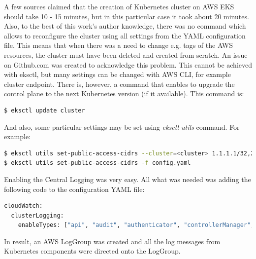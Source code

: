 A few sources claimed that the creation of Kubernetes cluster on AWS EKS should take 10 - 15 minutes\cite{eks-blog-part1}\cite{eks-blog2}, but in this particular case it took about 20 minutes. Also, to the best of this work’s author knowledge, there was no command which allows to reconfigure the cluster using all settings from the YAML configuration file. This means that when there was a need to change e.g. tags of the AWS resources, the cluster must have been deleted and created from scratch. An issue on Github.com was created to acknowledge this problem\cite{eksctl-no-config-update}. This cannot be achieved with eksctl, but many settings can be changed with AWS CLI, for example cluster endpoint\cite{eks-cluster-endpoint}. There is, however, a command that enables to upgrade the control plane to the next Kubernetes version (if it available). This command is:
\begin{lstlisting}[basicstyle=\tiny,caption={TODO},captionpos=b,language=Bash,xleftmargin=1cm]
$ eksctl update cluster
\end{lstlisting}
And also, some particular settings may be set using \textit{eksctl utils} command. For example\cite{eksctl-net}:
\begin{lstlisting}[basicstyle=\tiny,caption={TODO},captionpos=b,language=Bash,xleftmargin=1cm]
$ eksctl utils set-public-access-cidrs --cluster=<cluster> 1.1.1.1/32,2.2.2.0/24
$ eksctl utils set-public-access-cidrs -f config.yaml
\end{lstlisting}


Enabling the Central Logging was very easy. All what was needed was adding the following code to the configuration YAML file:
\begin{lstlisting}[basicstyle=\tiny,caption={TODO},captionpos=b,language=Bash,xleftmargin=1cm]
cloudWatch:
  clusterLogging:
    enableTypes: ["api", "audit", "authenticator", "controllerManager", "scheduler"]
\end{lstlisting}

In result, an AWS LogGroup was created and all the log messages from Kubernetes components were directed onto the LogGroup.


